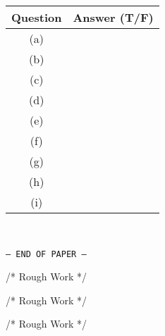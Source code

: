 \documentclass[11pt]{exam}
\begin{document}
\begin{questions}
\begin{center}
\begin{tabular}{|c|c|}
\hline
\textbf{Question} & \textbf{Answer (T/F)} \\ \hline
(a) &  \\ \hline
(b) &  \\ \hline
(c) &  \\ \hline
(d) &  \\ \hline
(e) &  \\ \hline
(f) &  \\ \hline
(g) &  \\ \hline
(h) &  \\ \hline
(i) &  \\ \hline
\end{tabular}
\end{center}
\end{questions}
\ \\[10pt]
\begin{center}
    \texttt{--- END OF PAPER ---}
\end{center}

\newpage

\begin{center}
    /* Rough Work */
\end{center}
\newpage

\begin{center}
    /* Rough Work */
\end{center}
\newpage

\begin{center}
    /* Rough Work */
\end{center}
\newpage
\end{document}
